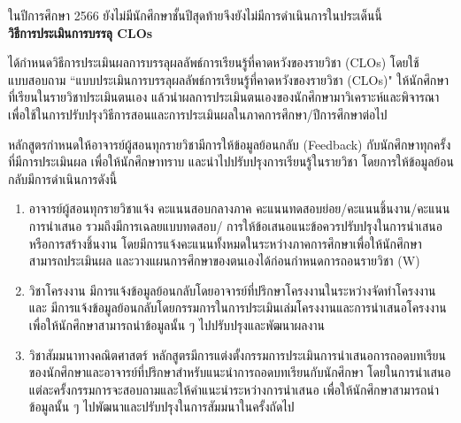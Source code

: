 ในปีการศึกษา 2566 \printprogram{} ยังไม่มีนักศึกษาชั้นปีสุดท้ายจึงยังไม่มีการดำเนินการในประเด็นนี้\\

\noindent
{\bf วิธีการประเมินการบรรลุ CLOs}

\printprogram{} ได้กำหนดวิธีการประเมินผลการบรรลุผลลัพธ์การเรียนรู้ที่คาดหวังของรายวิชา  (CLOs) โดยใช้แบบสอบถาม ``แบบประเมินการบรรลุผลลัพธ์การเรียนรู้ที่คาดหวังของรายวิชา (CLOs)"  ให้นักศึกษาที่เรียนในรายวิชาประเมินตนเอง
แล้วนำผลการประเมินตนเองของนักศึกษามาวิเคราะห์และพิจารณาเพื่อใช้ในการปรับปรุงวิธีการสอนและการประเมินผลในภาคการศึกษา/ปีการศึกษาต่อไป
\begin{doclist}
\end{doclist}


หลักสูตรกำหนดให้อาจารย์ผู้สอนทุกรายวิชามีการให้ข้อมูลย้อนกลับ (Feedback) กับนักศึกษาทุกครั้งที่มีการประเมินผล เพื่อให้นักศึกษาทราบ  และนำไปปรับปรุงการเรียนรู้ในรายวิชา โดยการให้ข้อมูลย้อนกลับมีการดำเนินการดังนี้
\begin{enumerate}
	\item อาจารย์ผู้สอนทุกรายวิชาแจ้ง คะแนนสอบกลางภาค คะแนนทดสอบย่อย/คะแนนชิ้นงาน/คะแนนการนำเสนอ รวมถึงมีการเฉลยแบบทดสอบ/ การให้ข้อเสนอแนะข้อควรปรับปรุงในการนำเสนอหรือการสร้างชิ้นงาน โดยมีการแจ้งคะแนนทั้งหมดในระหว่างภาคการศึกษาเพื่อให้นักศึกษาสามารถประเมินผล และวางแผนการศึกษาของตนเองได้ก่อนกำหนดการถอนรายวิชา (W)
	\item วิชาโครงงาน มีการแจ้งข้อมูลย้อนกลับโดยอาจารย์ที่ปรึกษาโครงงานในระหว่างจัดทำโครงงาน และ มีการแจ้งข้อมูลย้อนกลับโดยกรรมการในการประเมินเล่มโครงงานและการนำเสนอโครงงานเพื่อให้นักศึกษาสามารถนำข้อมูลนั้น ๆ ไปปรับปรุงและพัฒนาผลงาน
	\item วิชาสัมมนาทางคณิตศาสตร์ หลักสูตรมีการแต่งตั้งกรรมการประเมินการนำเสนอการถอดบทเรียนของนักศึกษาและอาจารย์ที่ปรึกษาสำหรับแนะนำการถอดบทเรียนกับนักศึกษา โดยในการนำเสนอแต่ละครั้งกรรมการจะสอบถามและให้คำแนะนำระหว่างการนำเสนอ
เพื่อให้นักศึกษาสามารถนำข้อมูลนั้น ๆ ไปพัฒนาและปรับปรุงในการสัมมนาในครั้งถัดไป
\end{enumerate}



